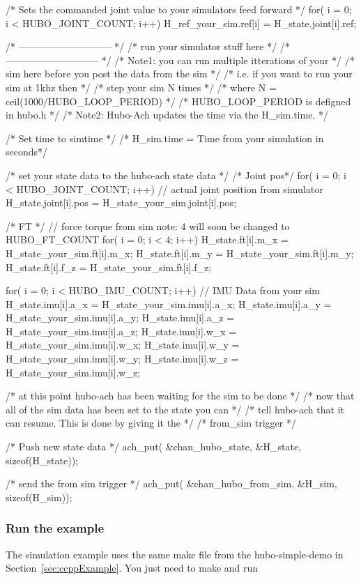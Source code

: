 \begin{code}
{{        /* Sets the commanded joint value to your simulators feed forward */
        for( i = 0; i < HUBO_JOINT_COUNT; i++){
	    H_ref_your_sim.ref[i] = H_state.joint[i].ref;		
        }

       /* ----------------------------- */
       /* run your simulator stuff here */
       /* ----------------------------- */
       /* Note1: you can run multiple itterations of your      */
       /*       sim here before you post the data from the sim */
       /*       i.e. if you want to run your sim at 1khz then  */
       /*       step your sim N times                          */
       /*       where N = ceil(1000/HUBO_LOOP_PERIOD)   */
       /*       HUBO_LOOP_PERIOD is defigned in hubo.h  */
       /* Note2: Hubo-Ach updates the time via the H_sim.time. */

       /* Set time to simtime */
       /* H_sim.time = Time from your simulation in seconds*/

        /* set your state data to the hubo-ach state data */
        /* Joint pos*/
        for( i = 0; i < HUBO_JOINT_COUNT; i++){
            // actual joint position from simulator
            H_state.joint[i].pos = H_state_your_sim.joint[i].pos;  
        }

        /* FT */
        // force torque from sim  note: 4 will soon be changed to HUBO_FT_COUNT
        for( i = 0; i < 4; i++){        
            H_state.ft[i].m_x = H_state_your_sim.ft[i].m_x;
            H_state.ft[i].m_y = H_state_your_sim.ft[i].m_y;
            H_state.ft[i].f_z = H_state_your_sim.ft[i].f_z;
        }

        for( i = 0; i < HUBO_IMU_COUNT; i++){        // IMU Data from your sim
            H_state.imu[i].a_x = H_state_your_sim.imu[i].a_x;
            H_state.imu[i].a_y = H_state_your_sim.imu[i].a_y;
            H_state.imu[i].a_z = H_state_your_sim.imu[i].a_z;
            H_state.imu[i].w_x = H_state_your_sim.imu[i].w_x;
            H_state.imu[i].w_y = H_state_your_sim.imu[i].w_y;
            H_state.imu[i].w_z = H_state_your_sim.imu[i].w_z;
       }

       /* at this point hubo-ach has been waiting for the sim to be done */
       /* now that all of the sim data has been set to the state you can */
       /* tell hubo-ach that it can resume.  This is done by giving it the */
       /* from_sim trigger */

       /* Push new state data */
       ach_put( &chan_hubo_state, &H_state, sizeof(H_state));

       /* send the from sim trigger */
       ach_put( &chan_hubo_from_sim, &H_sim, sizeof(H_sim));
    }
}
\end{code}
\normalsize

\subsubsection{Run the example}
The simulation example uses the same make file from the hubo-simple-demo in Section~\ref{sec:ccppExample}. You just need to make and run

